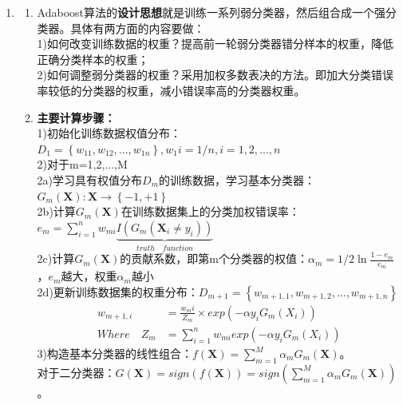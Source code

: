 \documentclass[a4paper,11pt,onecolumn,oneside,UTF8]{article}
\begin{document}
\begin{enumerate}
      \item
            \begin{enumerate}[(1)]
                  \item
                        Adaboost算法的\textbf{设计思想}就是训练一系列弱分类器，然后组合成一个强分类器。具体有两方面的内容要做：\\
                        1)如何改变训练数据的权重？提高前一轮弱分类器错分样本的权重，降低正确分类样本的权重；\\
                        2)如何调整弱分类器的权重？采用加权多数表决的方法。即加大分类错误率较低的分类器的权重，减小错误率高的分类器权重。\\
                  \item
                        \textbf{主要计算步骤：}\\
                        1)初始化训练数据权值分布：$D_1=\left\{w_{11},w_{12},...,w_{1n}\right\}, w_1i=1/n, i=1,2,...,n$\\
                        2)对于m=1,2,...,M\\
                        2a)学习具有权值分布$D_m$的训练数据，学习基本分类器：$G_m\left(\bm X\right): \bm X → \left\{-1,+1\right\}$\\
                        2b)计算$G_m\left(\bm X\right)$在训练数据集上的分类加权错误率：$e_m=\sum\limits_{i=1}^nw_{mi}\underbrace{I(G_m\left(\bm X_i\neq y_i\right))}_{truth\quad function}$\\
                        2c)计算$G_m\left(\bm X\right)$的贡献系数，即第m个分类器的权值：$\alpha_m=1/2\ln \frac{1-e_m}{e_m}$，$e_m$越大，权重$\alpha_m$越小\\
                        2d)更新训练数据集的权重分布：$D_{m+1}=\left\{w_{m+1,1},w_{m+1,2},...,w_{m+1,n}\right\}$\\
                        $$
                              \begin{aligned}
                                    w_{m+1,i}       & =\frac{w_mi}{Z_m}×exp\left(-\alpha y_iG_m\left(X_i\right)\right)         \\
                                    Where \quad Z_m & =\sum\limits_{i=1}^nw_{mi}exp\left(-\alpha y_iG_m\left(X_i\right)\right)
                              \end{aligned}
                        $$
                        3)构造基本分类器的线性组合：$f\left(\bm X\right)=\sum\limits_{m=1}^M\alpha_mG_m\left(\bm X\right)$。\\
                        对于二分类器：$G\left(\bm X\right)=sign\left(f\left(\bm X\right)\right)=sign\left(\sum\limits_{m=1}^M\alpha_mG_m\left(\bm X\right)\right)$。

\end{enumerate}
\end{enumerate}
\end{document}
